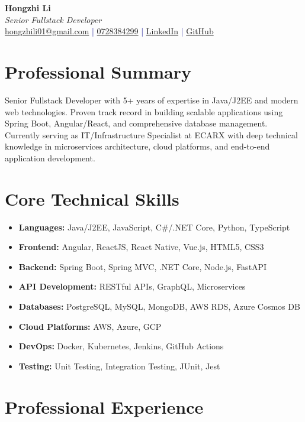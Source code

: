 \documentclass[11pt,a4paper]{article}
\begin{document}
\pagestyle{empty} %

\begin{center}
{\LARGE \textbf{Hongzhi Li}}\\[10pt]
{\Large \textit{Senior Fullstack Developer}}\\[10pt]
\textcolor{darkblue}{\href{mailto:hongzhili01@gmail.com}{hongzhili01@gmail.com} | \href{tel:0728384299}{0728384299} | \href{https://www.linkedin.com/in/hzl/}{LinkedIn} | \href{https://github.com/bluehawana}{GitHub}}
\end{center}

\section*{Professional Summary}
Senior Fullstack Developer with 5+ years of expertise in Java/J2EE and modern web technologies. Proven track record in building scalable applications using Spring Boot, Angular/React, and comprehensive database management. Currently serving as IT/Infrastructure Specialist at ECARX with deep technical knowledge in microservices architecture, cloud platforms, and end-to-end application development.

\section*{Core Technical Skills}
\begin{itemize}[noitemsep]
\item \textbf{Languages:} Java/J2EE, JavaScript, C\#/.NET Core, Python, TypeScript
\item \textbf{Frontend:} Angular, ReactJS, React Native, Vue.js, HTML5, CSS3
\item \textbf{Backend:} Spring Boot, Spring MVC, .NET Core, Node.js, FastAPI
\item \textbf{API Development:} RESTful APIs, GraphQL, Microservices
\item \textbf{Databases:} PostgreSQL, MySQL, MongoDB, AWS RDS, Azure Cosmos DB
\item \textbf{Cloud Platforms:} AWS, Azure, GCP
\item \textbf{DevOps:} Docker, Kubernetes, Jenkins, GitHub Actions
\item \textbf{Testing:} Unit Testing, Integration Testing, JUnit, Jest
\end{itemize}

\section*{Professional Experience}
\end{document}
